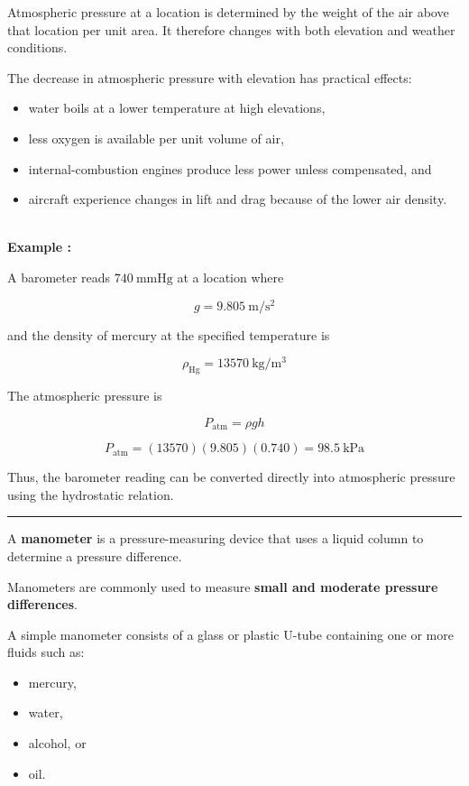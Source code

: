 \documentclass[12pt]{article}
\newcommand{\mysubsection}[2]{%
    \noindent{\headingfont\large #1\space #2\par}
    \vspace{4pt}
    \hrule
    \vspace{15pt}
}
\begin{document}
Atmospheric pressure at a location is determined by the weight of the air above that location per unit area. It therefore changes with both elevation and weather conditions.

The decrease in atmospheric pressure with elevation has practical effects:
\begin{itemize}
    \item water boils at a lower temperature at high elevations,
    \item less oxygen is available per unit volume of air,
    \item internal-combustion engines produce less power unless compensated, and
    \item aircraft experience changes in lift and drag because of the lower air density.
\end{itemize}

\textbf{\\ Example : }

A barometer reads $740\ \mathrm{mmHg}$ at a location where

\begin{equation*}
    g = 9.805\ \mathrm{m/s^2}
\end{equation*}

and the density of mercury at the specified temperature is

\begin{equation*}
    \rho_{\mathrm{Hg}} = 13570\ \mathrm{kg/m^3}
\end{equation*}

The atmospheric pressure is

\begin{equation*}
    P_{\mathrm{atm}} = \rho gh
\end{equation*}

\begin{equation*}
    P_{\mathrm{atm}}
    =
    (13570)(9.805)(0.740)
    =
    98.5\ \mathrm{kPa}
\end{equation*}

Thus, the barometer reading can be converted directly into atmospheric pressure using the hydrostatic relation.

\mysubsection{}{The Manometer}

A \textbf{manometer} is a pressure-measuring device that uses a liquid column to determine a pressure difference.

Manometers are commonly used to measure \textbf{small and moderate pressure differences}.

A simple manometer consists of a glass or plastic U-tube containing one or more fluids such as:
\begin{itemize}
    \item mercury,
    \item water,
    \item alcohol, or
    \item oil.
\end{itemize}
\end{document}
